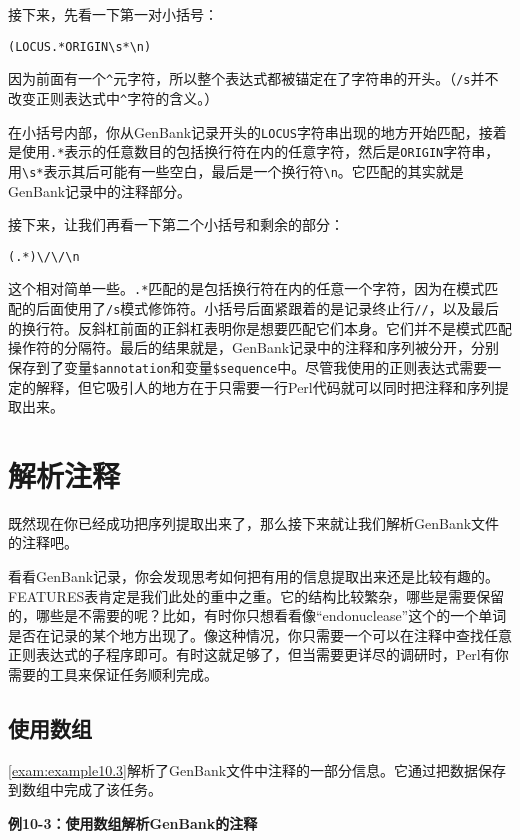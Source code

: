 接下来，先看一下第一对小括号：

\begin{lstlisting}
(LOCUS.*ORIGIN\s*\n)
\end{lstlisting}

因为前面有一个\verb|^|元字符，所以整个表达式都被锚定在了字符串的开头。（\verb|/s|并不改变正则表达式中\verb|^|字符的含义。） 

在小括号内部，你从GenBank记录开头的\verb|LOCUS|字符串出现的地方开始匹配，接着是使用\verb|.*|表示的任意数目的包括换行符在内的任意字符，然后是\verb|ORIGIN|字符串，用\verb|\s*|表示其后可能有一些空白，最后是一个换行符\verb|\n|。它匹配的其实就是GenBank记录中的注释部分。

接下来，让我们再看一下第二个小括号和剩余的部分：

\begin{lstlisting}
(.*)\/\/\n
\end{lstlisting}

这个相对简单一些。\verb|.*|匹配的是包括换行符在内的任意一个字符，因为在模式匹配的后面使用了\verb|/s|模式修饰符。小括号后面紧跟着的是记录终止行\verb|//|，以及最后的换行符。反斜杠前面的正斜杠表明你是想要匹配它们本身。它们并不是模式匹配操作符的分隔符。最后的结果就是，GenBank记录中的注释和序列被分开，分别保存到了变量\verb|$annotation|和变量\verb|$sequence|中。尽管我使用的正则表达式需要一定的解释，但它吸引人的地方在于只需要一行Perl代码就可以同时把注释和序列提取出来。

\section{解析注释}
既然现在你已经成功把序列提取出来了，那么接下来就让我们解析GenBank文件的注释吧。

看看GenBank记录，你会发现思考如何把有用的信息提取出来还是比较有趣的。FEATURES表肯定是我们此处的重中之重。它的结构比较繁杂，哪些是需要保留的，哪些是不需要的呢？比如，有时你只想看看像“endonuclease”这个的一个单词是否在记录的某个地方出现了。像这种情况，你只需要一个可以在注释中查找任意正则表达式的子程序即可。有时这就足够了，但当需要更详尽的调研时，Perl有你需要的工具来保证任务顺利完成。

\subsection{使用数组}
\autoref{exam:example10.3}解析了GenBank文件中注释的一部分信息。它通过把数据保存到数组中完成了该任务。
  
\textbf{例10-3：使用数组解析GenBank的注释}


